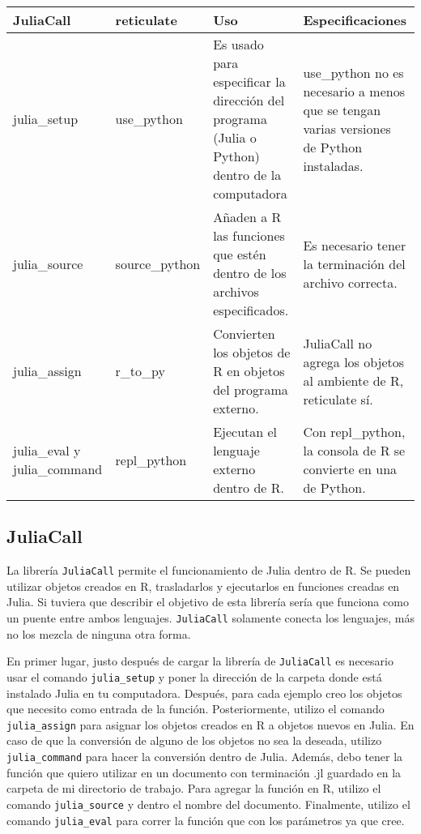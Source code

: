 \begin{tabular}{ |p{2cm}|p{2.5cm}|p{3cm}|p{3cm}|  }
	\hline
	JuliaCall & reticulate & Uso & Especificaciones\\
	\hline
	julia\_setup   & use\_python    & Es usado para especificar la dirección del programa (Julia o Python) dentro de la computadora &   use\_python no es necesario a menos que se tengan varias versiones de Python instaladas.\\
	\hline
	julia\_source &   source\_python  & Añaden a R las funciones que estén dentro de los archivos especificados.   & Es necesario tener la terminación del archivo correcta.\\
	\hline
	julia\_assign & r\_to\_py &  Convierten los objetos de R en objetos del programa externo. &  JuliaCall no agrega los objetos al ambiente de R, reticulate sí.\\
	\hline
	julia\_eval y julia\_command  & repl\_python\(\) & Ejecutan el lenguaje externo dentro de R. &  Con repl\_python, la consola de R se convierte en una de Python.\\
	\hline
\end{tabular}

\subsection{JuliaCall}
La librería \texttt{JuliaCall} permite el funcionamiento de \textsf{Julia} dentro de \textsf{R}. Se pueden utilizar objetos creados en \textsf{R}, trasladarlos y ejecutarlos en funciones creadas en \textsf{Julia}. Si tuviera que describir el objetivo de esta librería sería que funciona como un puente entre ambos lenguajes. \texttt{JuliaCall} solamente conecta los lenguajes, más no los mezcla de ninguna otra forma. 


En primer lugar, justo después de cargar la librería de \texttt{JuliaCall} es necesario usar el comando \texttt{julia\_setup} y poner la dirección de la carpeta donde está instalado Julia en tu computadora. Después, para cada ejemplo creo los objetos que necesito como entrada de la función. Posteriormente, utilizo el comando \texttt{julia\_assign} para asignar los objetos creados en R a objetos nuevos en Julia. En caso de que la conversión de alguno de los objetos no sea la deseada, utilizo \texttt{julia\_command} para hacer la conversión dentro de Julia. Además, debo tener la función que quiero utilizar en un documento con terminación \textsf{.jl} guardado en la carpeta de mi directorio de trabajo. Para agregar la función en R, utilizo el comando \texttt{julia\_source} y dentro el nombre del documento. Finalmente, utilizo el comando \texttt{julia\_eval} para correr la función que con los parámetros ya que cree. 

